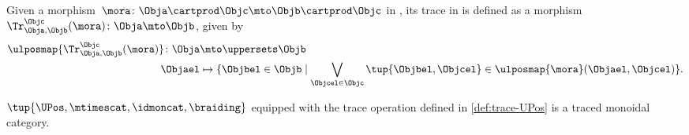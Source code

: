 \begin{definition}
\label{def:trace-UPos}
Given a morphism~$\mora\colon \Obja \cartprod \Objc \mto \Objb\cartprod \Objc$ in \UPos, its trace in is defined as a morphism~$\Tr_{\Obja,\Objb}^{\Objc}(\mora)\colon \Obja \mto \Objb$, given by
\begin{equation}
\begin{aligned}
\ulposmap{\Tr_{\Obja,\Objb}^{\Objc}(\mora)}\colon \Obja &\mto \uppersets \Objb\\
\Objael & \mapsto \{\Objbel \in \Objb \mid \bigvee_{\Objcel \in \Objc}\tup{\Objbel, \Objcel}\in \ulposmap{\mora}(\Objael,\Objcel)\}.
\end{aligned}
\end{equation}
\end{definition}
\begin{lemma}
\label{lem:UPos-is-traced}
$\tup{\UPos,\mtimescat, \idmoncat,\braiding}$ equipped with the trace operation defined in \cref{def:trace-UPos} is a traced monoidal category.
\end{lemma}
